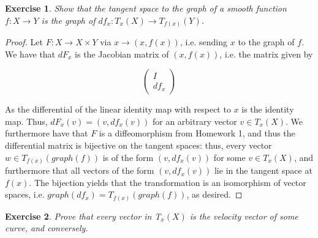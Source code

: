 \documentclass{article}
\newtheorem{exercise}{Exercise}
\begin{document}
      \begin{exercise}
       Show that the tangent space to the graph of a smooth function $f:X \to Y$ is the graph of $df_{x}: T_{x}(X) \to T_{f(x)}(Y)$. 
     \end{exercise}

     \begin{proof}
       Let $F: X \to X \times Y$ via $x \to (x,f(x))$, i.e. sending $x$ to the graph of $f$. We have that $dF_{x}$ is the Jacobian matrix of $(x,f(x))$, i.e. the matrix given by

       \[
         \begin{pmatrix} I \\ df_{x} \end{pmatrix}
       \]

       As the differential of the linear identity map with respect to $x$ is the identity map. Thus, $dF_{x}(v) = (v, df_{x}(v))$ for an arbitrary vector $v \in T_{x}(X)$. We furthermore have that $F$ is a diffeomorphism from Homework 1, and thus the differential matrix is bijective on the tangent spaces: thus, every vector $w \in T_{f(x)}(graph(f))$ is of the form $(v, df_{x}(v))$ for some $v \in T_{x}(X)$, and furthermore that all vectors of the form $(v,df_{x}(v))$ lie in the tangent space at $f(x)$. The bijection yields that the transformation is an isomorphism of vector spaces, i.e. $graph(df_{x}) = T_{f(x)}(graph(f))$, as desired.   
     \end{proof}
     
      \begin{exercise}
      Prove that every vector in T$_{x}(X)$ is the velocity vector of some curve, and conversely.
      \end{exercise}
\end{document}
